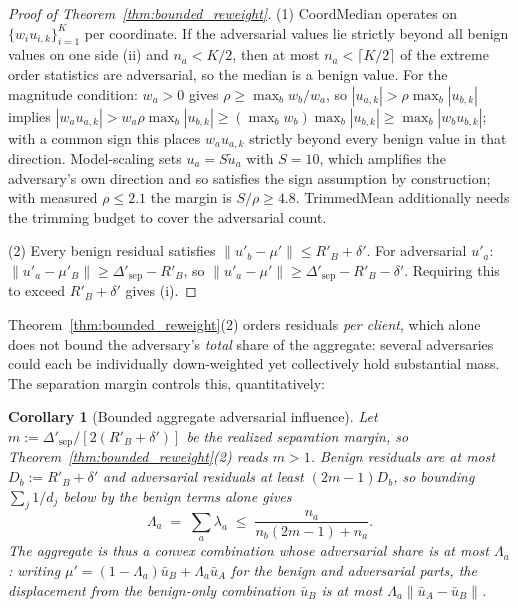 \documentclass{article}
\newtheorem{corollary}{Corollary}
\begin{document}
\begin{proof}[Proof of Theorem~\ref{thm:bounded_reweight}]
(1) CoordMedian operates on $\{w_i u_{i,k}\}_{i=1}^K$ per coordinate. If the adversarial values lie strictly beyond all benign values on one side (ii) and $n_a < K/2$, then at most $n_a < \lceil K/2 \rceil$ of the extreme order statistics are adversarial, so the median is a benign value. For the magnitude condition: $w_a > 0$ gives $\rho \geq \max_b w_b / w_a$, so $|u_{a,k}| > \rho\max_b|u_{b,k}|$ implies $|w_a u_{a,k}| > w_a\rho\max_b|u_{b,k}| \geq (\max_b w_b)\max_b|u_{b,k}| \geq \max_b|w_b u_{b,k}|$; with a common sign this places $w_a u_{a,k}$ strictly beyond every benign value in that direction. Model-scaling sets $u_a = S\tilde u_a$ with $S{=}10$, which amplifies the adversary's own direction and so satisfies the sign assumption by construction; with measured $\rho \leq 2.1$ the margin is $S/\rho \geq 4.8$. TrimmedMean additionally needs the trimming budget to cover the adversarial count.

(2) Every benign residual satisfies $\|u'_b - \mu'\| \leq R'_B + \delta'$. For adversarial $u'_a$: $\|u'_a - \mu'_B\| \geq \Delta'_{\mathrm{sep}} - R'_B$, so $\|u'_a - \mu'\| \geq \Delta'_{\mathrm{sep}} - R'_B - \delta'$. Requiring this to exceed $R'_B + \delta'$ gives (i).
\end{proof}

\noindent Theorem~\ref{thm:bounded_reweight}(2) orders residuals \emph{per client}, which alone does not bound the adversary's \emph{total} share of the aggregate: several adversaries could each be individually down-weighted yet collectively hold substantial mass. The separation margin controls this, quantitatively:

\begin{corollary}[Bounded aggregate adversarial influence]
\label{cor:aggregate_mass}
Let $m := \Delta'_{\mathrm{sep}}/[2(R'_B+\delta')]$ be the realized separation margin, so Theorem~\ref{thm:bounded_reweight}(2) reads $m > 1$. Benign residuals are at most $D_b := R'_B+\delta'$ and adversarial residuals at least $(2m-1)D_b$, so bounding $\sum_j 1/d_j$ below by the benign terms alone gives
\[
\Lambda_a \;=\; \textstyle\sum_{a}\lambda_a \;\leq\; \frac{n_a}{n_b(2m-1)+n_a}.
\]
The aggregate is thus a convex combination whose adversarial share is at most $\Lambda_a$: writing $\mu' = (1-\Lambda_a)\bar u_B + \Lambda_a \bar u_A$ for the benign and adversarial parts, the displacement from the benign-only combination $\bar u_B$ is at most $\Lambda_a\|\bar u_A - \bar u_B\|$.
\end{corollary}
\end{document}
